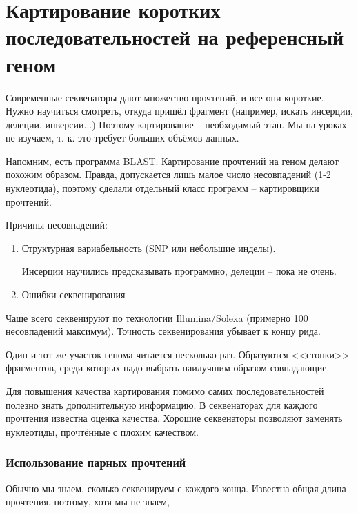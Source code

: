 \documentclass[main.tex]{subfiles}
\begin{document}
    \section{Картирование коротких последовательностей на референсный геном}

    Современные секвенаторы дают множество прочтений, и все они короткие.
    Нужно научиться смотреть, откуда пришёл фрагмент (например, искать инсерции, делеции, инверсии...)
    Поэтому картирование -- необходимый этап.
    Мы на уроках не изучаем, т. к. это требует больших объёмов данных.

    Напомним, есть программа BLAST.
    Картирование прочтений на геном делают похожим образом.
    Правда, допускается лишь малое число несовпадений (1-2 нуклеотида), поэтому сделали отдельный класс программ -- картировщики прочтений.

    Причины несовпадений:
    \begin{enumerate}[noitemsep]
        \item Структурная вариабельность (SNP или небольшие инделы).

        Инсерции научились предсказывать программно, делеции -- пока не очень.
        \item Ошибки секвенирования
    \end{enumerate}

    Чаще всего секвенируют по технологии Illumina/Solexa (примерно 100 несовпадений максимум).
    Точность секвенирования убывает к концу рида.


    Один и тот же участок генома читается несколько раз.
    Образуются <<стопки>> фрагментов, среди которых надо выбрать наилучшим образом совпадающие.

    Для повышения качества картирования помимо самих последовательностей полезно знать дополнительную информацию.
    В секвенаторах для каждого прочтения известна оценка качества.
    Хорошие секвенаторы позволяют заменять нуклеотиды, прочтённые с плохим качеством.

    \subsubsection{Использование парных прочтений}

    Обычно мы знаем, сколько секвенируем с каждого конца.
    Известна общая длина прочтения, поэтому, хотя мы не знаем,  %
\end{document}
